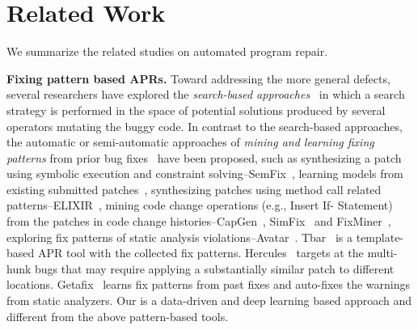 \section{Related Work}
We summarize the related studies on automated program repair.

{\bf Fixing pattern based APRs.} 
%
Toward addressing the more general
defects, several researchers have explored the {\em search-based
	approaches}~\cite{le2011genprog,qi2014strength,LeGoues-icse12,martinez2016astor}
in which a search strategy is performed in the space of potential
solutions produced by several operators mutating the buggy
code. %
%
In contrast to the search-based approaches, 
the automatic or semi-automatic approaches of {\em mining and learning fixing patterns} from prior bug
fixes~\cite{le2016history, kim2013automatic,nguyen2013semfix,liu2019avatar,tbar-issta19} have been proposed, such as synthesizing a patch using symbolic execution and
constraint solving--SemFix~\cite{nguyen2013semfix},  
learning models from existing submitted patches~\cite{long2016automatic,long2017automatic,le2016history}, synthesizing
patches using method call related patterns--ELIXIR~\cite{saha2017elixir}, mining code change operations (e.g., Insert If- Statement) from the patches in code change histories--CapGen~\cite{wen2018context}, SimFix~\cite{jiang2018shaping} and
FixMiner~\cite{koyuncu2018fixminer}, exploring fix patterns of static analysis violations--Avatar~\cite{liu2019avatar}. Tbar~\cite{tbar-issta19} is a template-based APR tool with the collected fix patterns.
Hercules~\cite{saha2019harnessing} targets at the multi-hunk bugs that may require applying a substantially similar patch to different locations. 
Getafix~\cite{bader2019getafix} learns fix patterns from past fixes and auto-fixes the warnings from static analyzers. 
Our {\tool} is a data-driven and deep learning based approach and different from the above pattern-based tools. 




